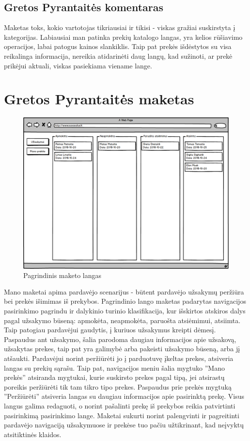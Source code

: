\documentclass[oneside]{VUMIFPSkursinis}
\begin{document}
	\subsection{Gretos Pyrantaitės komentaras}
	Maketas toks, kokio vartotojas tikriausiai ir tikisi - viskas gražiai suskirstyta į kategorijas. Labiausiai man patinka prekių katalogo langas, yra kelios rūšiavimo operacijos, labai patogus kainos slankiklis. Taip pat prekės išdėstytos su visa reikalinga informacija, nereikia atidarinėti daug langų, kad sužinoti, ar prekė prikėjui aktuali, viskas pasiekiama viename lange.

\section{Gretos Pyrantaitės maketas}
\begin{figure}
  		\includegraphics[width=\linewidth]{Mano_uzsakymai.png}
  		\caption{Pagrindinis maketo langas}
 		 \label{fig:mak2}
	\end{figure}
Mano maketai apima pardavėjo scenarijus -  būtent pardavėjo užsakymų peržiūra bei prekės išimimas iš prekybos.
Pagrindinio lango maketas padarytas navigacijos pasirinkimo pagrindu ir dalykinio turinio klasifikacija, kur išskirtos atskiros dalys pagal užsakymo būseną: apmokėta, neapmokėta, paruošta atsiėmimui, atsiimta. 
Taip patogiau pardavėjui gaudytis, į kuriuos užsakymus kreipti dėmesį.
Paspaudus ant užsakymo, šalia parodoma daugiau informacijos apie užsakovą, užsakytas prekes, taip pat yra galimybė arba pakeisti užsakymo būseną, arba jį atšaukti.
Pardavėjui norint peržiūrėti jo į parduotuvę įkeltas prekes, atsiveria langas su prekių sąrašu.
Taip pat, navigacijos meniu šalia mygtuko ''Mano prekės'' atsiranda mygtukai, kurie suskirsto prekes pagal tipą, jei atsirastų poreikis peržiūrėti tik tam tikro tipo prekes.
Paspaudus prie prekės mygtuką ''Peržiūrėti'' atsiveria langas su daugiau informacijos apie pasirinktą prekę.
Visus langus galima redaguoti, o norint pašalinti prekę iš prekybos reikia patvirtinti pasirinkimą pasirinkimo lange.
Maketai sukurti norint palengvinti ir pagreitinti pardavėjo navigaciją užsakymuose ir prekėse tuo pačiu užtikrinant, kad neįvyktų atsitiktinės klaidos.
\end{document}

